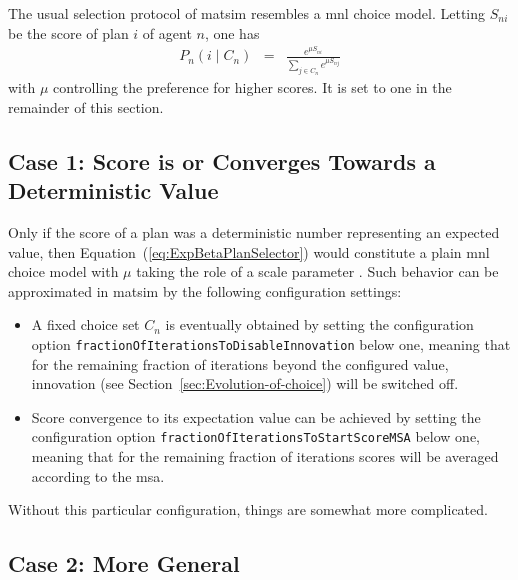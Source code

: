 The usual selection protocol of \gls{matsim} resembles a \gls{mnl}
choice model. Letting $S_{ni}$ be the score of plan $i$ of agent
$n$, one has
\begin{eqnarray}
P_{n}(i\mid C_{n}) & = & \frac{e^{\mu S_{ni}}}{\sum_{j\in C_{n}}e^{\mu S_{nj}}}\label{eq:ExpBetaPlanSelector}
\end{eqnarray}
with $\mu$ controlling the preference for higher scores.
It is set to one in the remainder of this section. 

\subsection{Case 1: Score is or Converges Towards a Deterministic Value}

Only if the score
of a plan was a deterministic number representing an expected value, 
then Equation~(\ref{eq:ExpBetaPlanSelector}) would constitute a plain \gls{mnl} choice model with $\mu$ taking the role
of a scale parameter \citep[see, e.g.,][p.45]{Train_2003}. 
Such behavior 
can be approximated in \acrshort{matsim} by the following configuration settings:
\begin{itemize}
\styleItemize
\item A fixed choice set $C_n$ is eventually obtained by setting the configuration option \verb$fractionOfIterationsToDisableInnovation$ below one,  
meaning that for the remaining fraction of iterations beyond the configured value, innovation (see Section~\ref{sec:Evolution-of-choice}) will be switched off.
\item Score convergence to its expectation value can be achieved by setting the configuration option \verb$fractionOfIterationsToStartScoreMSA$ below one, 
meaning that for the remaining fraction of iterations scores will be averaged according to the \acrfull{msa}.
\end{itemize}
%

Without this particular configuration, things are somewhat more complicated.


\subsection{Case 2: More General}

